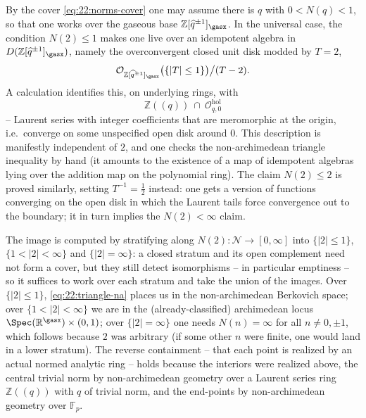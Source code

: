 \begin{remark}
\label{rmk:22:triangle-proof}
By the cover \eqref{eq:22:norms-cover} one may assume there is $q$ with
$0<N(q)<1$, so that one works over the gaseous base $\mathbb Z[\widehat q^{\pm1}]
_\gasx$. In the universal case, the condition $N(2)\le1$ makes one live over an
idempotent algebra in $D(\mathbb Z[\widehat q^{\pm1}]_\gasx)$, namely the
overconvergent closed unit disk modded by $T=2$,
\begin{equation*}
\mathcal O_{\mathbb Z[\widehat q^{\pm1}]_\gasx}\bigl(\{|T|\le1\}\bigr)\big/(T-2).
\end{equation*}
A calculation identifies this, on underlying rings, with
\begin{equation*}
\mathbb Z(\!(q)\!)\ \cap\ \mathcal O^{\mathrm{hol}}_{q,0}
\end{equation*}
-- Laurent series with integer coefficients that are meromorphic at the origin,
i.e.\ converge on some unspecified open disk around $0$. This description is
manifestly independent of $2$, and one checks the non-archimedean triangle
inequality by hand (it amounts to the existence of a map of idempotent algebras
lying over the addition map on the polynomial ring). The claim $N(2)\le2$ is
proved similarly, setting $T^{-1}=\tfrac12$ instead: one gets a version of
functions converging on the open disk in which the Laurent tails force
convergence out to the boundary; it in turn implies the $N(2)<\infty$ claim.
\end{remark}

\begin{remark}
\label{rmk:22:image-proof}
The image is computed by stratifying along $N(2)\colon\mathcal N\to[0,\infty]$
into $\{|2|\le1\}$, $\{1<|2|<\infty\}$ and $\{|2|=\infty\}$: a closed stratum
and its open complement need not form a cover, but they still detect
isomorphisms -- in particular emptiness -- so it suffices to work over each
stratum and take the union of the images. Over $\{|2|\le1\}$,
\eqref{eq:22:triangle-na} places us in the non-archimedean Berkovich space; over
$\{1<|2|<\infty\}$ we are in the (already-classified) archimedean locus
$\Spec(\mathbb R^\gasx)\times(0,1)$; over $\{|2|=\infty\}$ one needs $N(n)=\infty$
for all $n\neq0,\pm1$, which follows because $2$ was arbitrary (if some other
$n$ were finite, one would land in a lower stratum). The reverse containment --
that each point is realized by an actual normed analytic ring -- holds because
the interiors were realized above, the central trivial norm by non-archimedean
geometry over a Laurent series ring $\mathbb Z(\!(q)\!)$ with $q$ of trivial
norm, and the end-points by non-archimedean geometry over $\mathbb F_p$.
\end{remark}

